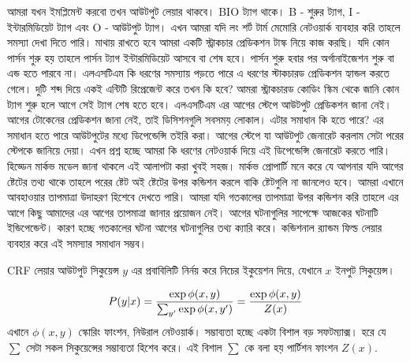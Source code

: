 \documentclass{book}
\begin{document}
\begin{comment}

\begin{figure}[htbp] %
   \centering
    
   \caption{রিকারেন্ট নেটওয়ার্ক সিকুয়েন্স ট্যাগিং}
   \label{fig:cbow}
\end{figure} 

\end{comment}

আমরা যখন ইমপ্লিমেন্ট করবো তখন আউটপুট লেয়ার থাকবে। BIO ট্যাগ থাকে। B - শুরুর ট্যাগ, I - ইন্টারমিডিয়েট ট্যাগ এবং O - আউটপুট ট্যাগ। এখন আমরা যদি লং শর্ট টার্ম মেমোরি নেটওয়ার্ক ব্যবহার করি তাহলে সমস্যা দেখা দিতে পারি। মাথায় রাখতে হবে আমরা একটি স্ট্রাকচার প্রেডিকশন টাস্ক নিয়ে কাজ করছি। যদি কোন পার্সন শুরু হয় তাহলে পার্সন ট্যাগ ইন্টারমিডিয়েট আসবে বা শেষ হবে। পার্সন শুরু হবার পর অর্গানাইজেশন শুরু বা এন্ড হতে পারবে না। এলএসটিএম কি ধরণের সমস্যায় পড়তে পারে এ ধরণের স্টাকচারড প্রেডিকশন হ্যান্ডল করতে গেলে। দুটি শব্দ দিয়ে একই এন্টিটি রিপ্রেজেন্ট করে তখন কি হবে? আমরা স্ট্রাকচারড কোডিং স্কিম থেকে জানি কোন ট্যাগ শুরু হলে আগে সেই ট্যাগ শেষ হতে হবে। এলএসটিএম এর আগের স্টেপে আউটপুট প্রেডিকশন জানা নেই। আগের টোকেনের প্রেডিকশন জানা নেই, তাই ডিসিশনগুলি সবসময় লোকাল। এটার সমাধান কি হতে পারে? এর সমাধান হতে পারে আউটপুটের মধ্যে ডিপেন্ডেন্সি তইরি করা। আগের স্টেপে যা আউটপুট জেনারেট করলাম সেটা পরের স্টেপকে জানিয়ে দেয়া। এখন প্রশ্ন হচ্ছে আমরা কি ধরণের নেটওয়ার্ক দিয়ে এই ডিপেন্ডেন্সি জেনারেট করতে পারি। হিড্ডেন মার্কভ মডেল জানা থাকলে এই আলাপটা করা খুবই সহজ। মার্কভ প্রোপার্টি মনে করে যে আপনার যদি আগের ষ্টেটের তথ্য থাকে তাহলে পরের ষ্টেট অই ষ্টেটের উপর কন্ডিশন করলে বাকি ষ্টেটগুলি না জানলেও হবে। আমরা এখানে আবহাওয়ার তাপমাত্রা উদাহরণ হিশেবে দেখতে পারি। আমরা যদি গতকালের তাপমাত্রা উপর কন্ডিশন করি তাহলে এর আগে কিছু আমাদের এর আগের তাপমাত্রা জানার প্রয়োজন নেই। আগের ঘটনাগুলির সাপেক্ষে আজকের ঘটনাটি ইন্ডিপেন্ডেন্ট। কারণ হচ্ছে গতকালের ঘটনা আগের ঘটনাগুলির তথ্য ক্যারি করে। কন্ডিশনাল র‍্যান্ডম ফিল্ড লেয়ার ব্যবহার করে এই সমস্যার সমাধান সম্ভব। 

CRF লেয়ার আউটপুট সিকুয়েন্স $y$ এর প্রবাবিলিটি নির্নয় করে নিচের ইকুয়েশন দিয়ে, যেখানে $x$ ইনপুট সিকুয়েন্স। 
 
\begin{equation} %
P(y|x) =  \frac{\exp \phi(x, y)}{\sum_{y^\prime} \exp \phi(x,y^\prime)} \\
= \frac{\exp \phi(x, y)}{Z(x)} \\
\end{equation}
এখানে $\phi(x,y)$ স্কোরিং ফাংশন,  নিউরাল নেটওয়ার্ক। সম্ভাব্যতা হচ্ছে একটা বিশাল বড় সফটম্যাক্স। হরে যে $\sum$ সেটা সকল সিকুয়েন্সের সম্ভাব্যতা হিশেব করে। এই বিশাল $\sum$ কে বলা হয় পার্টিশন ফাংশন $Z(x)$.
\end{document}
